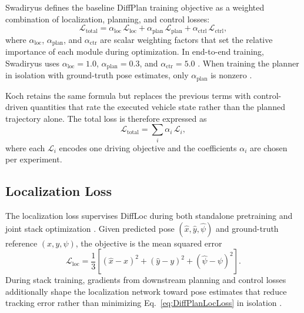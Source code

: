 Swadiryus \cite{swadiryus_DifferentiableMotionPlanning_2025} defines the baseline DiffPlan training objective as a weighted combination of localization, planning, and control losses:
\begin{equation}
    \mathcal{L}_{\text{total}} = \alpha_{\text{loc}}\,\mathcal{L}_{\text{loc}} + \alpha_{\text{plan}}\,\mathcal{L}_{\text{plan}} + \alpha_{\text{ctrl}}\,\mathcal{L}_{\text{ctrl}},
    \label{eq:DiffPlanTotalLoss}
\end{equation}
where $\alpha_{\text{loc}}$, $\alpha_{\text{plan}}$, and $\alpha_{\text{ctr}}$ are scalar weighting factors that set the relative importance of each module during optimization.
In end-to-end training, Swadiryus uses $\alpha_{\text{loc}} = 1.0$, $\alpha_{\text{plan}} = 0.3$, and $\alpha_{\text{ctr}} = 5.0$ \cite{swadiryus_DifferentiableMotionPlanning_2025}.
When training the planner in isolation with ground-truth pose estimates, only $\alpha_{\text{plan}}$ is nonzero \cite{swadiryus_DifferentiableMotionPlanning_2025}.

Koch \cite{koch_DifferentiableInterpretablePath_2025} retains the same formula but replaces the previous terms with control-driven quantities that rate the executed vehicle state rather than the planned trajectory alone.
The total loss is therefore expressed as
\begin{equation}
    \mathcal{L}_{\text{total}} = \sum_i \alpha_i\,\mathcal{L}_i,
    \label{eq:KochTotalLoss}
\end{equation}
where each $\mathcal{L}_i$ encodes one driving objective and the coefficients $\alpha_i$ are chosen per experiment.

\subsection{Localization Loss}

The localization loss supervises DiffLoc during both standalone pretraining and joint stack optimization \cite{swadiryus_DifferentiableMotionPlanning_2025, jahncke_MINDStackModularInterpretable_2025}.
Given predicted pose $(\hat{x}, \hat{y}, \hat{\psi})$ and ground-truth reference $(x, y, \psi)$, the objective is the mean squared error
\begin{equation}
    \mathcal{L}_{\text{loc}} = \frac{1}{3}\left[(\hat{x} - x)^2 + (\hat{y} - y)^2 + (\hat{\psi} - \psi)^2\right].
    \label{eq:DiffPlanLocLoss}
\end{equation}
During stack training, gradients from downstream planning and control losses additionally shape the localization network toward pose estimates that reduce tracking error rather than minimizing Eq.~\eqref{eq:DiffPlanLocLoss} in isolation \cite{jahncke_MINDStackModularInterpretable_2025, swadiryus_DifferentiableMotionPlanning_2025}.

